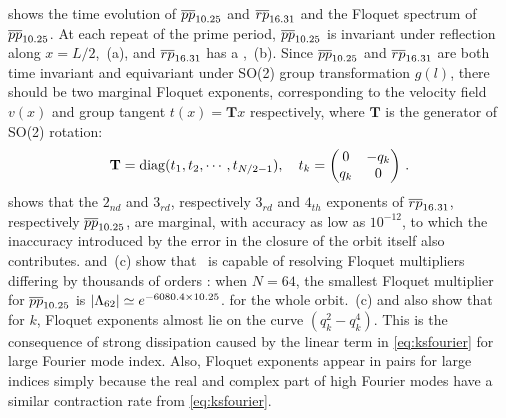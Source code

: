 \documentclass[final,leqno,onefignum,onetabnum]{siamltexmm}
\begin{document}
 shows the time evolution of ${\overline{pp}}_{10.25}$
and ${\overline{rp}}_{16.31}$ and the Floquet spectrum of ${\overline{pp}}_{10.25}$.
At each repeat of the prime period, ${\overline{pp}}_{10.25}$ is invariant
under reflection along $x=L/2$, \,(a), and
${\overline{rp}}_{16.31}$ has a ,
\,(b). Since ${\overline{pp}}_{10.25}$ and
${\overline{rp}}_{16.31}$ are both
time invariant and equivariant under SO(2) group transformation $g(l)$,
there should be two marginal Floquet exponents, corresponding to the
velocity field $v(x)$ and group tangent $t(x)=\mathbf{T}x$ respectively,
where $\mathbf{T}$ is the generator of SO(2) rotation:
\[
\mathbf{T}=\diag(t_{1},t_{2},\cdots,t_{N/2-1}),\quad
t_{k}=
\begin{pmatrix}
  0 & -q_{k} \\
  q_{k} & 0
\end{pmatrix}
\,.
\]
 shows that the $2_{nd}$ and $3_{rd}$,
respectively $3_{rd}$ and $4_{th}$ exponents of ${\overline{rp}}_{16.31}$,
respectively ${\overline{pp}}_{10.25}$, are marginal, with accuracy as low as
$10^{-12}$, to which the inaccuracy introduced by the error in the closure of
the orbit itself also contributes.  and
\,(c) show that \psd\ is capable of resolving
Floquet multipliers differing by thousands of orders :
when $N=64$, the smallest Floquet multiplier 
for ${\overline{pp}}_{10.25}$ is
$|\Lambda_{62}| \simeq e^{-6080.4\times 10.25}$.
 for the whole orbit.
\,(c) and  also
show that for  $k$, Floquet exponents almost lie on the
curve $(q_k^2 - q_k^4 )$. This is the consequence of
strong dissipation caused by the linear term in \eqref{eq:ksfourier} for
large Fourier mode index.
Also, Floquet exponents appear in pairs for large indices simply because
the real and complex part of high Fourier modes have a similar contraction
rate from \eqref{eq:ksfourier}.
\end{document}
